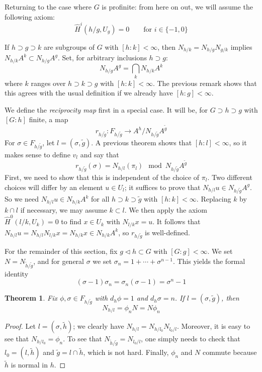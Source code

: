 \documentclass{article}
\newcommand{\frob}{F}
\newcommand{\tH}{\hat H}
\newtheorem{theorem}{Theorem}
\begin{document}
Returning to the case where $G$ is profinite: from here on out, we will assume 
the following axiom:
\[
  \tH^i(h/g,U_g) = 0 \qquad\mbox{for $i\in\{-1,0\}$}
\]

If $h\supset g\supset k$ are subgroups of $G$ with $[h:k]<\infty$, then 
$N_{h/k} = N_{h/g}N_{g/k}$ implies $N_{h/k} A^k\subset N_{h/g} A^g$. Set, for 
arbitrary inclusions $h\supset g$:
\[
  N_{h/g} A^g = \bigcap_k N_{h/k} A^k
\]
where $k$ ranges over $h\supset k\supset g$ with $[h:k]<\infty$. The previous 
remark shows that this agrees with the usual definition if we already have 
$[h:g]<\infty$. 

We define the \emph{reciprocity map} first in a special case. It will be, for 
$G\supset h\supset g$ with $[G:h]$ finite, a map 
\[
  r_{h/\tilde g} : \frob_{h/\tilde g} \to A^h/N_{h/\tilde g} A^{\tilde g}
\]
For $\sigma\in \frob_{h/\tilde g}$, let $l=(\sigma,\tilde g)$. A previous 
theorem shows that $[h:l]<\infty$, so it makes sense to define $v_l$ and 
say that 
\[
  r_{h/\tilde g}(\sigma) = N_{h/l}(\pi_l) \mod N_{h/\tilde g} A^{\tilde g} 
\]
First, we need to show that this is independent of the choice of $\pi_l$. Two 
different choices will differ by an element $u\in U_l$; it suffices to prove 
that $N_{h/l} u\in N_{h/\tilde g} A^g$. So we need $N_{h/l} u\in N_{h/k} A^k$ 
for all $h\supset k\supset \tilde g$ with $[h:k]<\infty$. Replacing $k$ by 
$k\cap l$ if necessary, we may assume $k\subset l$. We then apply the axiom 
$\tH^0(l/k,U_k) = 0$ to find $x\in U_k$ with $N_{l/k} x = u$. It follows that 
$N_{h/l} u = N_{h/l} N_{l/k} x = N_{h/k} x\in N_{h/k} A^k$, so $r_{h/\tilde g}$ 
is well-defined. 

For the remainder of this section, fix $g\lhd h\subset G$ with 
$[G:g]<\infty$. We set $N = N_{\tilde h/\tilde g}$, and for general $\sigma$ we 
set $\sigma_n = 1+\cdots + \sigma^{n-1}$. This yields the formal identity 
\[
  (\sigma-1)\sigma_n = \sigma_n(\sigma-1) = \sigma^n-1
\]

\begin{theorem}
Fix $\phi,\sigma\in \frob_{h/\tilde g}$ with $d_h \phi = 1$ and 
$d_h \sigma = n$. If $l=(\sigma,\tilde g)$, then 
\[
  N_{h/l} = \phi_n N = N \phi_n
\]
\end{theorem}
\begin{proof}
Let $l=(\sigma,\tilde h)$; we clearly have $N_{h/l} = N_{h/l_0} N_{l_0/l}$. 
Moreover, it is easy to see that $N_{h/l_0} = \phi_n$. To see that 
$N_{\tilde h/\tilde g} = N_{l_0/l}$, one simply needs to check that 
$l_0 = (l,\tilde h)$ and $\tilde g = l\cap \tilde h$, which is not hard. 
Finally, $\phi_n$ and $N$ commute because $\tilde h$ is normal in $h$. 
\end{proof}
\end{document}

